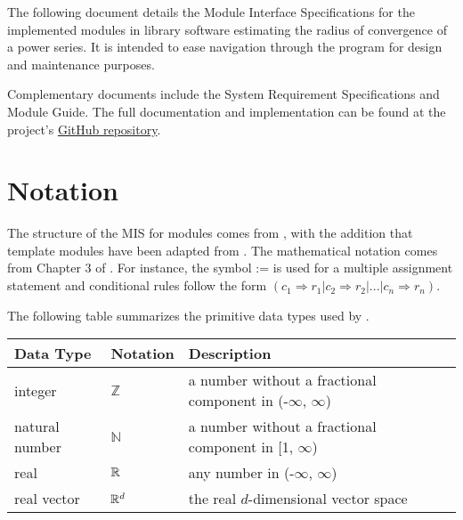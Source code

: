 \documentclass[12pt, titlepage]{article}
\begin{document}
The following document details the Module Interface Specifications for the implemented
modules in library software  estimating the radius of convergence of a power series.
It is intended to ease navigation through the program for design and maintenance purposes.

Complementary documents include the System Requirement Specifications and Module Guide.
The full documentation and implementation can be found at the project's
\href{https://github.com/JohnErnsthausen/roc}{GitHub repository}.

\section{Notation}


The structure of the MIS for modules comes from \citet{HoffmanAndStrooper1995},
with the addition that template modules have been adapted from
\cite{GhezziEtAl2003}.  The mathematical notation comes from Chapter 3 of
\citet{HoffmanAndStrooper1995}.  For instance, the symbol := is used for a
multiple assignment statement and conditional rules follow the form $(c_1
\Rightarrow r_1 | c_2 \Rightarrow r_2 | ... | c_n \Rightarrow r_n )$.

The following table summarizes the primitive data types used by . 

\begin{center}
\renewcommand{\arraystretch}{1.2}
\noindent 
\begin{tabular}{l l p{7.5cm}} 
\toprule 
\textbf{Data Type} & \textbf{Notation} & \textbf{Description}\\ 
\midrule
integer & $\mathbb{Z}$ & a number without a fractional component in (-$\infty$, $\infty$) \\
natural number & $\mathbb{N}$ & a number without a fractional component in [1, $\infty$) \\
real & $\mathbb{R}$ & any number in (-$\infty$, $\infty$)\\
  real vector & $\mathbb{R}^{d}$ & the real $d$-dimensional vector space \\
\bottomrule
\end{tabular} 
\end{center}

\end{document}
